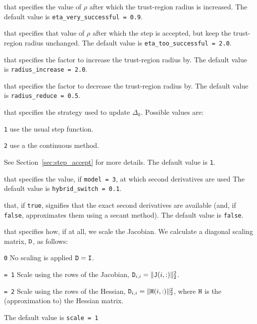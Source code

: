 \begin{description}

that specifies the value of $\rho$ after which the trust-region radius is increased.
The default value is {\tt eta\_very\_successful = 0.9}.

that specifies that value of $\rho$ after which the step is accepted, but keep the trust-region radius unchanged.
The default value is {\tt eta\_too\_successful = 2.0}.

that specifies the factor to increase the trust-region radius by.
The default value is {\tt radius\_increase = 2.0}.

that specifies the factor to decrease the trust-region radius by.
The default value is {\tt radius\_reduce = 0.5}.

that specifies the strategy used to update $\Delta_k$.  Possible values are:
\begin{description}
\item {\tt 1} use the usual step function.
\item {\tt 2} use a the continuous method.
\end{description}
See Section~\ref{sec:step_accept} for more details.
The default value is {\tt 1}.

that specifies the value, if {\tt model = 3}, at which second derivatives are used
The default value is {\tt hybrid\_switch = 0.1}.

that, if {\tt true}, signifies that the exact second derivatives are available (and, if {\tt false}, approximates them using a secant method).
The default value is {\tt false}.

that specifies how, if at all, we scale the Jacobian.  We calculate a diagonal scaling matrix, ${\tt D}$, as follows:
\begin{description}
\item{\tt 0} No scaling is applied ${\tt D} ={\tt I}$.
\item{\tt = 1} Scale using the rows of the Jacobian, \({\tt D}_{i,i} = \|{\tt J}(i,:)\|_2^2\).
\item{\tt = 2} Scale using the rows of the Hessian,  \({\tt D}_{i,i} = \|{\tt H}(i,:)\|_2^2\), where ${\tt H}$ is the (approximation to) the Hessian matrix.
\end{description}
The default value is {\tt scale = 1}


\end{description}
